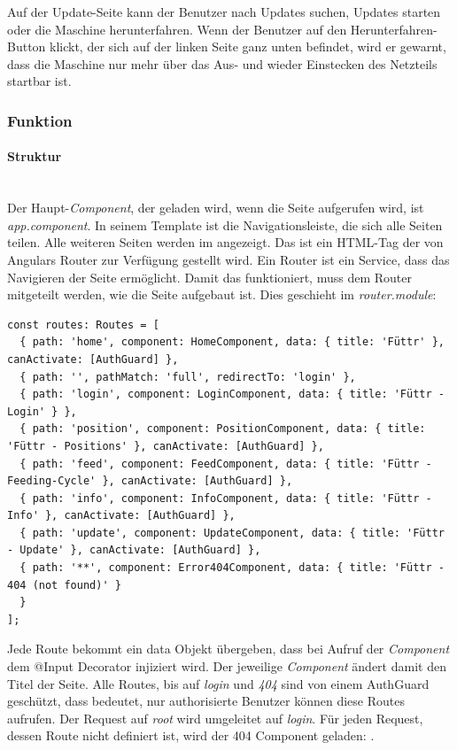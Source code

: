 Auf der Update-Seite kann der Benutzer nach Updates suchen, Updates starten oder die Maschine herunterfahren. Wenn der Benutzer auf den Herunterfahren-Button klickt, der sich auf der linken Seite ganz unten befindet, wird er gewarnt, dass die Maschine nur mehr über das Aus- und wieder Einstecken des Netzteils startbar ist.\\

\subsubsection{Funktion}
\label{sec:ums-client-funktion}

\paragraph*{Struktur} \mbox {}\\
Der Haupt-\textit{Component}, der geladen wird, wenn die Seite aufgerufen wird, ist \textit{app.component}. In seinem Template ist die Navigationsleiste, die sich alle Seiten teilen. Alle weiteren Seiten werden im  angezeigt. Das ist ein \ac{HTML}-Tag der von Angulars Router zur Verfügung gestellt wird. Ein Router ist ein Service, dass das Navigieren der Seite ermöglicht. Damit das funktioniert, muss dem Router mitgeteilt werden, wie die Seite aufgebaut ist. Dies geschieht im \textit{router.module}:

\begin{lstlisting}[caption=Routes Definition,style=TS]
const routes: Routes = [
  { path: 'home', component: HomeComponent, data: { title: 'Füttr' }, canActivate: [AuthGuard] },
  { path: '', pathMatch: 'full', redirectTo: 'login' },
  { path: 'login', component: LoginComponent, data: { title: 'Füttr - Login' } },
  { path: 'position', component: PositionComponent, data: { title: 'Füttr - Positions' }, canActivate: [AuthGuard] },
  { path: 'feed', component: FeedComponent, data: { title: 'Füttr - Feeding-Cycle' }, canActivate: [AuthGuard] },
  { path: 'info', component: InfoComponent, data: { title: 'Füttr - Info' }, canActivate: [AuthGuard] },
  { path: 'update', component: UpdateComponent, data: { title: 'Füttr - Update' }, canActivate: [AuthGuard] },
  { path: '**', component: Error404Component, data: { title: 'Füttr - 404 (not found)' }
  }
];
\end{lstlisting}

Jede Route bekommt ein data Objekt übergeben, dass bei Aufruf der \textit{Component} dem @Input Decorator injiziert wird. Der jeweilige \textit{Component} ändert damit den Titel der Seite. Alle Routes, bis auf \textit{login} und \textit{404} sind von einem AuthGuard geschützt, dass bedeutet, nur authorisierte Benutzer können diese Routes aufrufen. Der Request auf \textit{root}  wird umgeleitet auf \textit{login}. Für jeden Request, dessen Route nicht definiert ist, wird der 404 Component geladen: .

